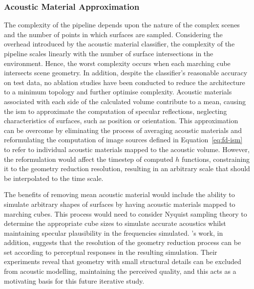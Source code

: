 \subsubsection{Acoustic Material Approximation}
The complexity of the pipeline depends upon the nature of the complex scenes and the number of points in which surfaces are sampled. Considering the overhead introduced by the acoustic material classifier, the complexity of the pipeline scales linearly with the number of surface intersections in the environment. Hence, the worst complexity occurs when each marching cube intersects scene geometry. In addition, despite the classifier's reasonable accuracy on test data, no ablation studies have been conducted to reduce the architecture to a minimum topology and further optimise complexity. Acoustic materials associated with each side of the calculated volume contribute to a mean, causing the \acrshort{ism} to approximate the computation of specular reflections, neglecting characteristics of surfaces, such as position or orientation. This approximation can be overcome by eliminating the process of averaging acoustic materials and reformulating the computation of image sources defined in Equation~\ref{eq:fd-ism} to refer to individual acoustic materials mapped to the acoustic volume. However, the reformulation would affect the timestep of computed $h$ functions, constraining it to the geometry reduction resolution, resulting in an arbitrary scale that should be interpolated to the time scale. \par
The benefits of removing mean acoustic material would include the ability to simulate arbitrary shapes of surfaces by having acoustic materials mapped to marching cubes. This process would need to consider Nyquist sampling theory to determine the appropriate cube sizes to simulate accurate acoustics whilst maintaining specular plausibility in the frequencies simulated. \citep{pelzer2010frequency}'s work, in addition, suggests that the resolution of the geometry reduction process can be set according to perceptual responses in the resulting simulation. Their experiments reveal that geometry with small structural details can be excluded from acoustic modelling, maintaining the perceived quality, and this acts as a motivating basis for this future iterative study. \par


